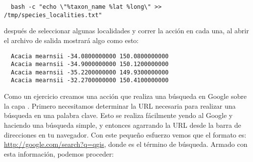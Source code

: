 \begin{verbatim}
  bash -c "echo \"%taxon_name %lat %long\" >> /tmp/species_localities.txt"
\end{verbatim} 

después de seleccionar algunas localidades y correr la acci\'on en cada una, al abrir
el archivo de salida mostrar\'a algo como esto:

\begin{verbatim}
  Acacia mearnsii -34.0800000000 150.0800000000
  Acacia mearnsii -34.9000000000 150.1200000000
  Acacia mearnsii -35.2200000000 149.9300000000
  Acacia mearnsii -32.2700000000 150.4100000000
\end{verbatim} 

Como un ejercicio creamos una acci\'on que realiza una b\'usqueda en Google sobre la capa 
. Primero necesitamos determinar la URL necesaria para realizar una b\'usqueda en una
palabra clave. Esto se realiza f\'acilmente yendo al Google y haciendo una b\'usqueda
simple, y entonces agarrando la URL desde la barra de direcciones en tu navegador. Con este
peque\~no esfuerzo vemos que el formato es: \url{http://google.com/search?q=qgis},
donde  es el t\'ermino de b\'usqueda. Armado con esta informaci\'on, podemos
proceder:

